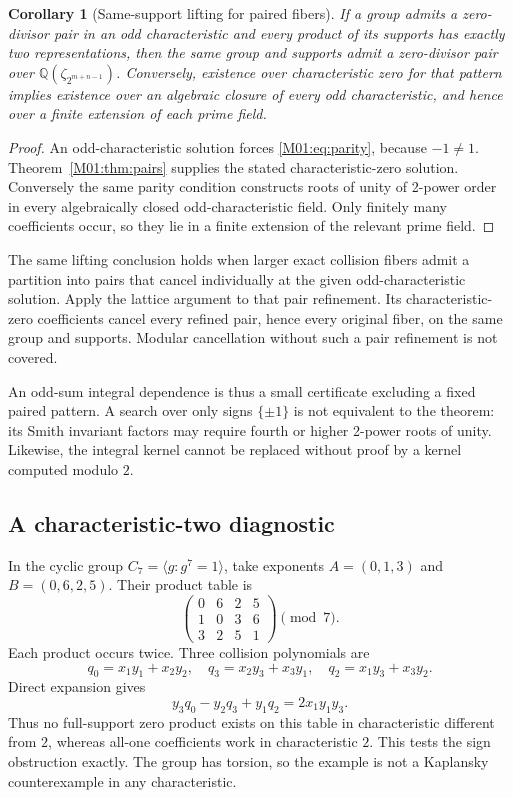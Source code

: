 \documentclass[11pt,a4paper,oneside]{report}
\newtheorem{corollary}[theorem]{Corollary}
\theoremstyle{definition}
\theoremstyle{remark}
\newcommand{\Q}{\mathbb Q}
\begin{document}
\begin{corollary}[Same-support lifting for paired fibers]\label{M01:cor:pairlift}
If a group admits a zero-divisor pair in an odd characteristic and every
product of its supports has exactly two representations, then the same
group and supports admit a zero-divisor pair over
$\Q(\zeta_{2^{m+n-1}})$. Conversely, existence over characteristic zero
for that pattern implies existence over an algebraic closure of every
odd characteristic, and hence over a finite extension of each prime field.
\end{corollary}
\begin{proof}
An odd-characteristic solution forces \eqref{M01:eq:parity}, because $-1\ne1$.
Theorem~\ref{M01:thm:pairs} supplies the stated characteristic-zero solution.
Conversely the same parity condition constructs roots of unity of
2-power order in every algebraically closed odd-characteristic field.
Only finitely many coefficients occur, so they lie in a finite extension
of the relevant prime field.
\end{proof}

The same lifting conclusion holds when larger exact collision fibers
admit a partition into pairs that cancel individually at the given
odd-characteristic solution. Apply the lattice argument to that pair
refinement. Its characteristic-zero coefficients cancel every refined
pair, hence every original fiber, on the same group and supports. Modular
cancellation without such a pair refinement is not covered.

An odd-sum integral dependence is thus a small certificate excluding a
fixed paired pattern. A search over only signs $\{\pm1\}$ is not
equivalent to the theorem: its Smith invariant factors may require fourth
or higher 2-power roots of unity. Likewise, the integral kernel cannot be
replaced without proof by a kernel computed modulo $2$.

\subsection{A characteristic-two diagnostic}

In the cyclic group $C_7=\langle g:g^7=1\rangle$, take exponents
$A=(0,1,3)$ and $B=(0,6,2,5)$. Their product table is
\[
\begin{pmatrix}
0&6&2&5\\1&0&3&6\\3&2&5&1
\end{pmatrix}\pmod7.
\]
Each product occurs twice. Three collision polynomials are
\[
q_0=x_1y_1+x_2y_2,\quad
q_3=x_2y_3+x_3y_1,\quad
q_2=x_1y_3+x_3y_2.
\]
Direct expansion gives
\begin{equation}\label{M01:eq:c7}
y_3q_0-y_2q_3+y_1q_2=2x_1y_1y_3.
\end{equation}
Thus no full-support zero product exists on this table in characteristic
different from $2$, whereas all-one coefficients work in characteristic
$2$. This tests the sign obstruction exactly. The group has torsion, so
the example is not a Kaplansky counterexample in any characteristic.
\end{document}
